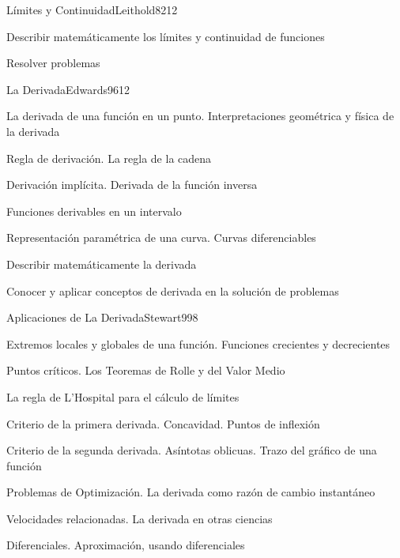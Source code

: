 \begin{syllabus}
\begin{unit}{Límites y Continuidad}{Leithold82}{12}
   \begin{learningoutcomes}
      \item Describir matemáticamente los límites y continuidad de funciones
	\item Resolver problemas
   \end{learningoutcomes}
\end{unit}

\begin{unit}{La Derivada}{Edwards96}{12}
\begin{topics}
	\item La derivada de una función en un punto. Interpretaciones geométrica y física de la derivada
	\item Regla de derivación. La regla de la cadena
	\item Derivación implícita. Derivada de la función inversa
	\item Funciones derivables en un intervalo
	\item Representación paramétrica de una curva. Curvas diferenciables
\end{topics}

\begin{learningoutcomes}
	\item Describir matemáticamente la derivada
	\item Conocer y aplicar conceptos de derivada en la solución de problemas
\end{learningoutcomes}
\end{unit}

\begin{unit}{Aplicaciones de La Derivada}{Stewart99}{8}
\begin{topics}
	\item Extremos locales y globales de una función. Funciones crecientes y decrecientes
	\item Puntos críticos. Los Teoremas de Rolle y del Valor Medio
	\item La regla de L'Hospital para el cálculo de límites
	\item Criterio de la primera derivada. Concavidad. Puntos de inflexión
	\item Criterio de la segunda derivada. Así­ntotas oblicuas. Trazo del gráfico de una función
	\item Problemas de Optimización. La derivada como razón de cambio instantáneo
	\item Velocidades relacionadas. La derivada en otras ciencias
	\item Diferenciales. Aproximación, usando diferenciales
\end{topics}


\end{unit}
\end{syllabus}
